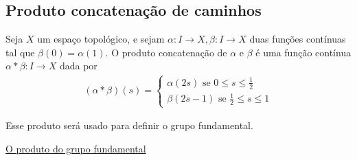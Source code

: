 \subsection{Produto concatenação de caminhos}
\label{Produto-concatenacao-def}
\begin{defi}
	Seja $X$ um espaço topológico, e sejam $\alpha:I\rightarrow X, \beta:I\rightarrow X$ duas funções contínuas tal que $\beta(0)=\alpha(1).$ O produto concatenação de $\alpha$ e $\beta$ é uma função contínua $\alpha*\beta:I\rightarrow X$ dada por 
 \begin{align*}
     (\alpha*\beta)(s)=\begin{cases}
         \alpha(2s)\mbox{ se }0\le s\le\frac{1}{2}\\
         \beta(2s-1)\mbox{ se }\frac{1}{2}\le s \le 1
     \end{cases}
 \end{align*}
\end{defi}

Esse produto será usado para definir o grupo fundamental.

	\item \hyperref[produto-bem-definido-prop]{O produto do grupo fundamental}

